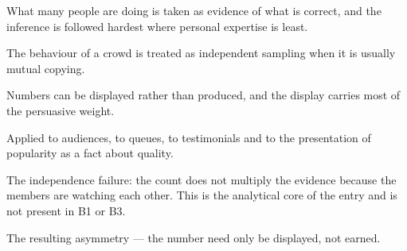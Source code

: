 

\begin{distilled}
  \item What many people are doing is taken as evidence of what is correct, and the inference is followed hardest where personal expertise is least.
  \item The behaviour of a crowd is treated as independent sampling when it is usually mutual copying.
  \item Numbers can be displayed rather than produced, and the display carries most of the persuasive weight.
  \item Applied to audiences, to queues, to testimonials and to the presentation of popularity as a fact about quality.
\end{distilled}

\begin{unique}
  \item The independence failure: the count does not multiply the evidence because the members are watching each other. This is the analytical core of the entry and is not present in B1 or B3.
  \item The resulting asymmetry --- the number need only be displayed, not earned.
\end{unique}
